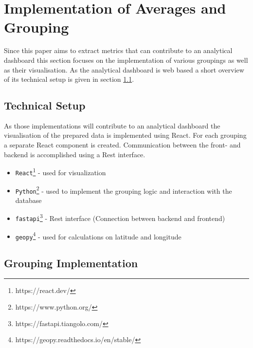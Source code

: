 %
%
% 
% 
% 

\chapter{Implementation of Averages and Grouping}
\label{chap:analytical_dashboard}
Since this paper aims to extract metrics that can contribute to an analytical dashboard this section focuses on the implementation of various groupings as well as their visualisation. As the analytical dashboard is web based a short overview of its technical setup is given in section \ref{sec:tech_set}.

\section{Technical Setup}
\label{sec:tech_set}
As those implementations will contribute to an analytical dashboard the visualisation of the prepared data is implemented using React. For each grouping a separate React component is created. Communication between the front- and backend is accomplished using a Rest interface. 

\begin{itemize}
\item  \verb|React|\footnote{https://react.dev/} - used for visualization
\item \verb|Python|\footnote{https://www.python.org/} - used to implement the grouping logic and interaction with the database
\item \verb|fastapi|\footnote{https://fastapi.tiangolo.com/} - Rest interface (Connection between backend and frontend) 
\item \verb|geopy|\footnote{https://geopy.readthedocs.io/en/stable/} - used for calculations on latitude and longitude 
\end{itemize}
\section{Grouping Implementation}

